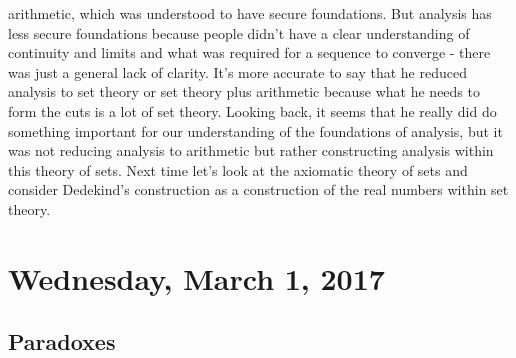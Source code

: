 \documentclass[12pt]{article}
\theoremstyle{definition}
\begin{document}
\begin{itemize}
        arithmetic, which was understood to have secure foundations. But
        analysis has less secure foundations because people didn't have a clear
        understanding of continuity and limits and what was required for a
        sequence to converge - there was just a general lack of clarity. It's
        more accurate to say that he reduced analysis to set theory or set
        theory plus arithmetic because what he needs to form the cuts is a lot
        of set theory. Looking back, it seems that he really did do something
        important for our understanding of the foundations of analysis, but it
        was not reducing analysis to arithmetic but rather constructing
        analysis within this theory of sets. Next time let's look at the
        axiomatic theory of sets and consider Dedekind's construction as a
        construction of the real numbers within set theory.

\end{itemize}

\section{Wednesday, March 1, 2017}

\subsection{Paradoxes}
\end{document}
